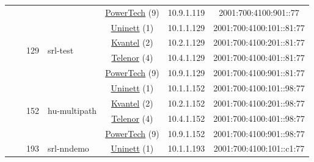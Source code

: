 \begin{small}
\begin{center}
\begin{longtable}{|c|c|c|c|c|c|c|c|}
  &  & \multicolumn{2}{|c|}{} & \multicolumn{2}{|c|}{\tiny{\href{http://www.powertech.no}{PowerTech} (9)}} & \tiny{10.9.1.119} & \tiny{2001:700:4100:901::77} \\* \cline{3-3}\cline{4-4}\cline{5-5}\cline{6-6}\cline{7-7}\cline{8-8}
  &  & \multirow{4}{*}{\tiny{129}} & \multicolumn{1}{|l|}{\multirow{4}{*}{\tiny{srl-test}}} & \multicolumn{2}{|c|}{\tiny{\href{https://www.uninett.no}{Uninett} (1)}} & \tiny{10.1.1.129} & \tiny{2001:700:4100:101::81:77} \\* \cline{5-5}\cline{6-6}\cline{7-7}\cline{8-8}
  &  &  &  & \multicolumn{2}{|c|}{\tiny{\href{http://kvantel.no}{Kvantel} (2)}} & \tiny{10.2.1.129} & \tiny{2001:700:4100:201::81:77} \\* \cline{5-5}\cline{6-6}\cline{7-7}\cline{8-8}
  &  &  &  & \multicolumn{2}{|c|}{\tiny{\href{https://www.telenor.no}{Telenor} (4)}} & \tiny{10.4.1.129} & \tiny{2001:700:4100:401::81:77} \\* \cline{5-5}\cline{6-6}\cline{7-7}\cline{8-8}
  &  &  &  & \multicolumn{2}{|c|}{\tiny{\href{http://www.powertech.no}{PowerTech} (9)}} & \tiny{10.9.1.129} & \tiny{2001:700:4100:901::81:77} \\* \cline{3-3}\cline{4-4}\cline{5-5}\cline{6-6}\cline{7-7}\cline{8-8}
  &  & \multirow{4}{*}{\tiny{152}} & \multicolumn{1}{|l|}{\multirow{4}{*}{\tiny{hu-multipath}}} & \multicolumn{2}{|c|}{\tiny{\href{https://www.uninett.no}{Uninett} (1)}} & \tiny{10.1.1.152} & \tiny{2001:700:4100:101::98:77} \\* \cline{5-5}\cline{6-6}\cline{7-7}\cline{8-8}
  &  &  &  & \multicolumn{2}{|c|}{\tiny{\href{http://kvantel.no}{Kvantel} (2)}} & \tiny{10.2.1.152} & \tiny{2001:700:4100:201::98:77} \\* \cline{5-5}\cline{6-6}\cline{7-7}\cline{8-8}
  &  &  &  & \multicolumn{2}{|c|}{\tiny{\href{https://www.telenor.no}{Telenor} (4)}} & \tiny{10.4.1.152} & \tiny{2001:700:4100:401::98:77} \\* \cline{5-5}\cline{6-6}\cline{7-7}\cline{8-8}
  &  &  &  & \multicolumn{2}{|c|}{\tiny{\href{http://www.powertech.no}{PowerTech} (9)}} & \tiny{10.9.1.152} & \tiny{2001:700:4100:901::98:77} \\* \cline{3-3}\cline{4-4}\cline{5-5}\cline{6-6}\cline{7-7}\cline{8-8}
  &  & \multirow{4}{*}{\tiny{193}} & \multicolumn{1}{|l|}{\multirow{4}{*}{\tiny{srl-nndemo}}} & \multicolumn{2}{|c|}{\tiny{\href{https://www.uninett.no}{Uninett} (1)}} & \tiny{10.1.1.193} & \tiny{2001:700:4100:101::c1:77} \\* \cline{5-5}\cline{6-6}\cline{7-7}\cline{8-8}

\end{longtable}
\end{center}
\end{small}
